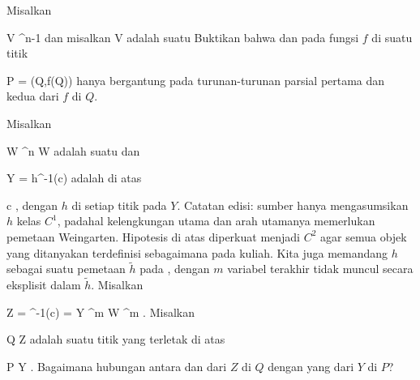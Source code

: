 {}
{

Misalkan

\mavergleichskette
{\vergleichskette
{ V
}
{ \subseteq }{ \R^{n-1}
}
{  }{
}
{    }{
}
{   }{
}
}
{}{}{}
dan misalkan
 { V } {\R
} {}
adalah suatu
Buktikan bahwa
dan
pada
fungsi $f$ di suatu titik

\mavergleichskette
{\vergleichskette
{ P
}
{ = }{ (Q,f(Q))
}
{  }{
}
{    }{
}
{   }{
}
}
{}{}{}
hanya bergantung pada turunan-turunan parsial pertama dan kedua dari $f$ di $Q$.

}
{} {}

{}
{

Misalkan

\mavergleichskette
{\vergleichskette
{ W
}
{ \subseteq }{ \R^n
}
{  }{
}
{    }{
}
{   }{
}
}
{}{}{}
 { W } { \R
} {}
adalah suatu
dan

\mavergleichskette
{\vergleichskette
{ Y
}
{ = }{ h^{-1}(c)
}
{  }{
}
{    }{
}
{   }{
}
}
{}{}{}
adalah
di atas

\mavergleichskette
{\vergleichskette
{ c
}
{ \in }{ \R
}
{  }{
}
{    }{
}
{   }{
}
}
{}{}{,}
dengan $h$
di setiap titik pada $Y$.
Catatan edisi: sumber hanya mengasumsikan $h$ kelas $C^1$, padahal kelengkungan utama dan arah utamanya memerlukan pemetaan Weingarten. Hipotesis di atas diperkuat menjadi $C^2$ agar semua objek yang ditanyakan terdefinisi sebagaimana pada kuliah.
Kita juga memandang $h$ sebagai suatu pemetaan $\tilde{h}$ pada
,
dengan $m$ variabel terakhir tidak muncul secara eksplisit dalam $\tilde{h}$. Misalkan

\mavergleichskettedisp
{\vergleichskette
{ Z
}
{ =} { ^{-1}(c)
}
{ =} { Y \times \R^m
}
{ \subseteq} { W \times \R^{m}
}
{ } {
}
}
{}{}{.}
Misalkan

\mavergleichskette
{\vergleichskette
{ Q
}
{ \in }{ Z
}
{  }{
}
{    }{
}
{   }{
}
}
{}{}{}
adalah suatu titik yang terletak di atas

\mavergleichskette
{\vergleichskette
{ P
}
{ \in }{ Y
}
{  }{
}
{    }{
}
{   }{
}
}
{}{}{.}
Bagaimana hubungan antara
dan
dari $Z$ di $Q$ dengan yang dari $Y$ di $P$?

}
{} {}

